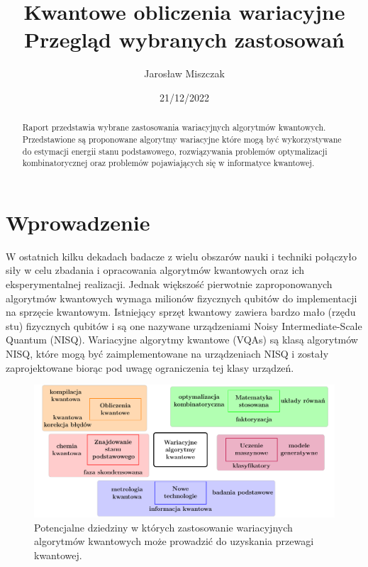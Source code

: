 \documentclass[a4paper,11pt]{article}
\begin{document}
\title{Kwantowe obliczenia wariacyjne\\ {\normalsize Przegląd wybranych zastosowań}}

\author{Jarosław Miszczak}
\date{21/12/2022}

\maketitle

\begin{abstract}
Raport przedstawia wybrane zastosowania wariacyjnych algorytmów kwantowych. Przedstawione są proponowane algorytmy wariacyjne które mogą być wykorzystywane do estymacji energii stanu podstawowego, rozwiązywania problemów optymalizacji kombinatorycznej oraz problemów pojawiających się w informatyce kwantowej.
\end{abstract}

\tableofcontents

\newpage


\hypertarget{wprowadzenie}{%
\section{Wprowadzenie}\label{wprowadzenie}}

W ostatnich kilku dekadach badacze z wielu obszarów nauki i techniki połączyło siły w celu zbadania i opracowania algorytmów kwantowych oraz ich eksperymentalnej realizacji. Jednak większość pierwotnie zaproponowanych algorytmów kwantowych wymaga milionów fizycznych qubitów do implementacji na sprzęcie kwantowym. Istniejący sprzęt kwantowy zawiera bardzo mało (rzędu stu) fizycznych qubitów i są one nazywane urządzeniami Noisy Intermediate-Scale Quantum (NISQ). Wariacyjne algorytmy kwantowe (VQAs) są klasą algorytmów NISQ, które mogą być zaimplementowane na urządzeniach NISQ i zostały zaprojektowane biorąc pod uwagę ograniczenia tej klasy urządzeń.

\begin{figure}[ht!]
	\centering
	\includegraphics[width=\textwidth]{vqa-applications-pl}
	\caption{Potencjalne dziedziny w których zastosowanie wariacyjnych algorytmów kwantowych może prowadzić do uzyskania przewagi kwantowej.}
\end{figure}
\end{document}
